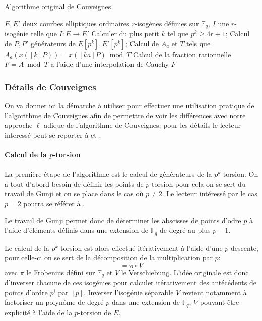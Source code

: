\documentclass[10pt,a4paper]{book}
\theoremstyle{plain}
\theoremstyle{definition}
\theoremstyle{definition}
\theoremstyle{definition}
\theoremstyle{definition}
\theoremstyle{remark}
\theoremstyle{remark}
\theoremstyle{definition}
\begin{document}
\begin{algorithm}
\caption{\label{alg:orig:Couv} Algorithme original de Couveignes}
\begin{algorithmic}[1]
\REQUIRE $E,E'$ deux courbes elliptiques ordinaires $r$-isogènes définies sur $\mathbb{F}_q$,%
\ENSURE $I$ une $r$-isogénie telle que $I:E \rightarrow E'$
\STATE Calculer du plus petit $k$ tel que $p^k \geqslant 4r+1$;
\STATE Calcul de $P,P'$ générateurs de $E[p^k],E'[p^k]$;
\STATE Calcul de $A_a$ et $T$ tels que $A_a(x([k]P))=x([ka]P) \bmod T$
\STATE Calcul de la fraction rationnelle $F=A \bmod T$ à l'aide d'une 
interpolation de Cauchy
\RETURN $F$
\ENDIF
\ENDFOR
\end{algorithmic}
\end{algorithm}

\subsubsection{Détails de Couveignes }
On va donner ici la démarche à utiliser pour effectuer une utilisation 
pratique de l'algorithme de Couveignes afin de permettre de voir les différences
avec notre approche $\ell$-adique de l'algorithme de Couveignes, pour les 
détails le lecteur interessé peut se reporter à \cite{Couveignes96} et 
\cite{DeFeo11}.
\paragraph{Calcul de la $p$-torsion}
La première étape de l'algorithme est le calcul de générateurs de la $p^k$ 
torsion. On a tout d'abord besoin de définir les points de $p$-torsion pour 
cela on se sert du travail de Gunji \cite{Gunji76} et on se place dans le cas 
où $p \neq 2$. Le lecteur intéressé par le cas $p=2$ pourra se référer à 
\cite[3.2]{DeFeo11}.

Le travail de Gunji \cite[Theorem 4]{Gunji76} permet donc de déterminer les 
abscisses de points d'odre $p$ à l'aide d'éléments définis dans une extension 
de $\mathbb{F}_q$ de degré au plus $p-1$.  

Le calcul de la $p^k$-torsion est alors effectué itérativement à l'aide d'une 
$p$-descente, pour celle-ci on se sert de la décomposition de la multiplication
par $p$: 
\begin{equation}
[p]=\pi \circ V
\end{equation}
avec $\pi$ le Frobenius défini sur $\mathbb{F}_q$ et $V$ le Verschiebung. 
L'idée originale est donc d'inverser chacune  de ces isogénies pour calculer 
itérativement des antécédents de points d'ordre $p^i$ par $[p]$. Inverser 
l'isogénie séparable $V$ revient notamment à factoriser un polynôme de degré 
$p$ dans une extension de $\mathbb{F}_q$, $V$ pouvant être explicité à l'aide 
de la $p$-torsion de $E$. 
\end{document}
